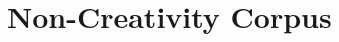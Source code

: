 \documentclass[10pt,letterpaper]{article}
\begin{document}
%
%

%
\section*{Non-Creativity Corpus}\label{S2_Appendix}
\end{document}
